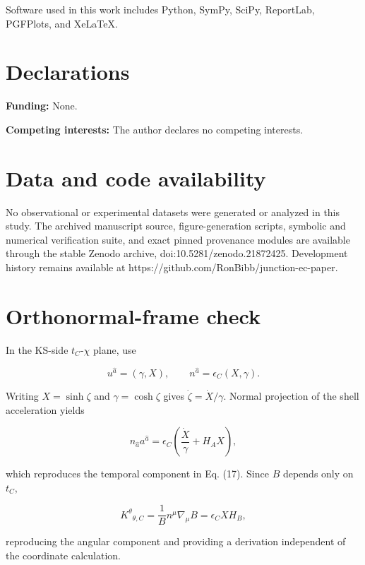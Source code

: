 \documentclass[pdflatex,sn-mathphys-num]{sn-jnl}
\begin{document}
Software used in this work includes Python, SymPy, SciPy, ReportLab, PGFPlots, and XeLaTeX.


\section*{Declarations}

\textbf{Funding:} None.


\textbf{Competing interests:} The author declares no competing interests.


\section*{Data and code availability}

No observational or experimental datasets were generated or analyzed in this study. The archived manuscript source, figure-generation scripts, symbolic and numerical verification suite, and exact pinned provenance modules are available through the stable Zenodo archive, doi:10.5281/zenodo.21872425. Development history remains available at https://github.com/RonBibb/junction-ec-paper.


\appendix
\section{Orthonormal-frame check}

In the KS-side \(t_C\)-\(\chi\) plane, use


\begin{equation}
u^{\hat a}=(\gamma,X),
\qquad
n^{\hat a}=\epsilon_C(X,\gamma).
\tag{A1}
\end{equation}

Writing \(X=\sinh\zeta\) and \(\gamma=\cosh\zeta\) gives \(\dot\zeta=\dot X/\gamma\). Normal projection of the shell acceleration yields


\begin{equation}
n_{\hat a}a^{\hat a}
=\epsilon_C\left(\frac{\dot X}{\gamma}+H_AX\right),
\tag{A2}
\end{equation}

which reproduces the temporal component in Eq. (17). Since \(B\) depends only on \(t_C\),


\begin{equation}
K^\theta{}_{\theta,C}
=\frac{1}{B}n^\mu\nabla_\mu B
=\epsilon_CXH_B,
\tag{A3}
\end{equation}

reproducing the angular component and providing a derivation independent of the coordinate calculation.
\end{document}
